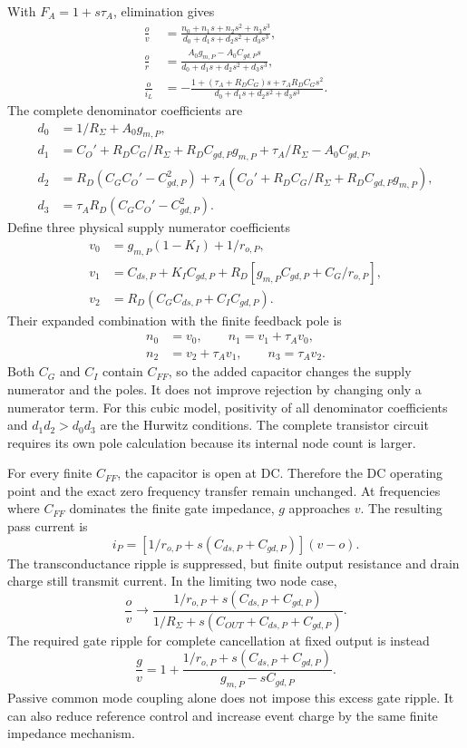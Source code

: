 With $F_A=1+s\tau_A$, elimination gives
\begin{align}
\frac{o}{v}&=\frac{n_0+n_1s+n_2s^2+n_3s^3}
 {d_0+d_1s+d_2s^2+d_3s^3},\\
\frac{o}{r}&=\frac{A_0g_{m,P}-A_0C_{gd,P}s}
 {d_0+d_1s+d_2s^2+d_3s^3},\\
\frac{o}{i_L}&=-\frac{1+(\tau_A+R_DC_G)s+\tau_AR_DC_Gs^2}
 {d_0+d_1s+d_2s^2+d_3s^3}.
\end{align}
The complete denominator coefficients are
\begin{align}
d_0&=1/R_\Sigma+A_0g_{m,P},\\
d_1&=C_O'+R_DC_G/R_\Sigma+R_DC_{gd,P}g_{m,P}
      +\tau_A/R_\Sigma-A_0C_{gd,P},\\
d_2&=R_D(C_GC_O'-C_{gd,P}^2)
      +\tau_A(C_O'+R_DC_G/R_\Sigma+R_DC_{gd,P}g_{m,P}),\\
d_3&=\tau_AR_D(C_GC_O'-C_{gd,P}^2).
\end{align}
Define three physical supply numerator coefficients
\begin{align}
v_0&=g_{m,P}(1-K_I)+1/r_{o,P},\\
v_1&=C_{ds,P}+K_IC_{gd,P}
      +R_D\left[g_{m,P}C_{gd,P}+C_G/r_{o,P}\right],\\
v_2&=R_D(C_GC_{ds,P}+C_IC_{gd,P}).
\end{align}
Their expanded combination with the finite feedback pole is
\begin{align}
n_0&=v_0,\qquad n_1=v_1+\tau_Av_0,\\
n_2&=v_2+\tau_Av_1,\qquad n_3=\tau_Av_2.
\end{align}
Both $C_G$ and $C_I$ contain $C_{FF}$, so the added capacitor changes
the supply numerator and the poles. It does not improve rejection by
changing only a numerator term. For this cubic model, positivity of
all denominator coefficients and $d_1d_2>d_0d_3$ are the Hurwitz
conditions. The complete transistor circuit requires its own pole
calculation because its internal node count is larger.

For every finite $C_{FF}$, the capacitor is open at DC. Therefore the
DC operating point and the exact zero frequency transfer remain
unchanged. At frequencies where $C_{FF}$ dominates the finite gate
impedance, $g$ approaches $v$. The resulting pass current is
\begin{equation}
i_P=\left[1/r_{o,P}+s(C_{ds,P}+C_{gd,P})\right](v-o).
\end{equation}
The transconductance ripple is suppressed, but finite output resistance
and drain charge still transmit current. In the limiting two node case,
\begin{equation}
\frac{o}{v}\longrightarrow
\frac{1/r_{o,P}+s(C_{ds,P}+C_{gd,P})}
 {1/R_\Sigma+s(C_{OUT}+C_{ds,P}+C_{gd,P})}.
\end{equation}
The required gate ripple for complete cancellation at fixed output is
instead
\begin{equation}
\frac{g}{v}=1+\frac{1/r_{o,P}+s(C_{ds,P}+C_{gd,P})}
 {g_{m,P}-sC_{gd,P}}.
\end{equation}
Passive common mode coupling alone does not impose this excess gate
ripple. It can also reduce reference control and increase event charge
by the same finite impedance mechanism.

